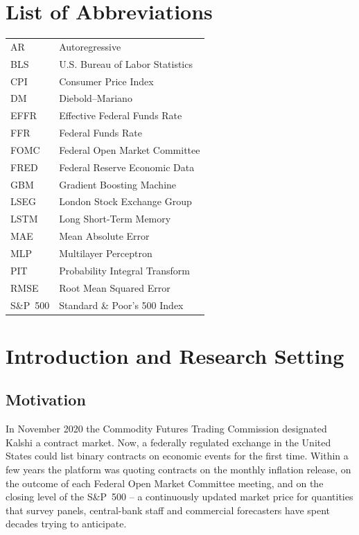 \documentclass[12pt,a4paper]{report}
\newcounter{frontmatterendpage}
\begin{document}
\clearpage
\chapter*{List of Abbreviations}
\begin{tabular}{@{}ll@{}}
AR & Autoregressive \\
BLS & U.S. Bureau of Labor Statistics \\
CPI & Consumer Price Index \\
DM & Diebold--Mariano \\
EFFR & Effective Federal Funds Rate \\
FFR & Federal Funds Rate \\
FOMC & Federal Open Market Committee \\
FRED & Federal Reserve Economic Data \\
GBM & Gradient Boosting Machine \\
LSEG & London Stock Exchange Group \\
LSTM & Long Short-Term Memory \\
MAE & Mean Absolute Error \\
MLP & Multilayer Perceptron \\
PIT & Probability Integral Transform \\
RMSE & Root Mean Squared Error \\
S\&P~500 & Standard \& Poor's 500 Index \\
\end{tabular}

\clearpage
\setcounter{frontmatterendpage}{\value{page}}
\setcounter{page}{1}


\chapter{Introduction and Research Setting}
\label{ch:intro}

\section{Motivation}
\label{sec:motivation}

In November 2020 the Commodity Futures Trading Commission designated Kalshi a
contract market. Now, a federally regulated exchange in the United States could
list binary contracts on economic events for the first time. Within a few
years the platform was quoting contracts on the monthly inflation release, on
the outcome of each Federal Open Market Committee meeting, and on the closing
level of the S\&P~500 -- a continuously updated market price for quantities
that survey panels, central-bank staff and commercial forecasters have spent
decades trying to anticipate.
\end{document}
